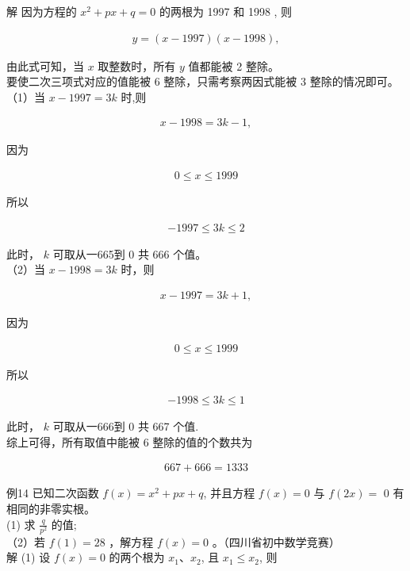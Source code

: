 \documentclass[10pt]{article}
\begin{document}
解 因为方程的 $x^{2}+p x+q=0$ 的两根为 1997 和 1998 , 则

\begin{align*}
y=(x-1997)(x-1998),
\end{align*}

由此式可知，当 $x$ 取整数时，所有 $y$ 值都能被 2 整除。\\
要使二次三项式对应的值能被 6 整除，只需考察两因式能被 3 整除的情况即可。\\
（1）当 $x-1997=3 k$ 时,则

\begin{align*}
x-1998=3 k-1,
\end{align*}

因为

\begin{align*}
0 \leqslant x \leqslant 1999
\end{align*}

所以

\begin{align*}
-1997 \leqslant 3 k \leqslant 2
\end{align*}

此时， $k$ 可取从一665到 0 共 666 个值。\\
（2）当 $x-1998=3 k$ 时，则

\begin{align*}
x-1997=3 k+1,
\end{align*}

因为

\begin{align*}
0 \leqslant x \leqslant 1999
\end{align*}

所以

\begin{align*}
-1998 \leqslant 3 k \leqslant 1
\end{align*}

此时， $k$ 可取从一666到 0 共 667 个值.\\
综上可得，所有取值中能被 6 整除的值的个数共为

\begin{align*}
667+666=1333
\end{align*}

例14 已知二次函数 $f(x)=x^{2}+p x+q$, 并且方程 $f(x)=0$ 与 $f(2 x)=$ 0 有相同的非零实根。\\
(1) 求 $\frac{q}{p^{2}}$ 的值;\\
（2）若 $f(1)=28$ ，解方程 $f(x)=0$ 。（四川省初中数学竞赛）\\
解 (1) 设 $f(x)=0$ 的两个根为 $x_{1} 、 x_{2}$, 且 $x_{1} \leqslant x_{2}$, 则
\end{document}
